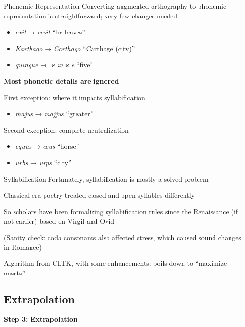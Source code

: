 \documentclass{beamer}
\begin{document}
\begin{frame}{Phonemic Representation}
Converting augmented orthography to phonemic representation is straightforward; very few changes needed
\vspace{-1em}
\begin{itemize}
    \item \emph{exit} → \emph{ecsit} ``he leaves''
    \item \emph{Karthāgō} → \emph{Carthāgō} ``Carthage (city)''
    \item \emph{quīnque} → \emph{\(\varkappa\)īn\(\varkappa\)e} ``five''
\end{itemize}

\textbf{Most phonetic details are ignored}

First exception: where it impacts syllabification
\vspace{-1em}
\begin{itemize}
    \item \emph{majus} → \emph{majjus} ``greater''
\end{itemize}
\vspace{-0.75em}
Second exception: complete neutralization
\vspace{-1em}
\begin{itemize}
    \item \emph{equus} → \emph{ecus} ``horse''
    \item \emph{urbs} → \emph{urps} ``city''
\end{itemize}
\end{frame}

\begin{frame}{Syllabification}
Fortunately, syllabification is mostly a solved problem

Classical-era poetry treated closed and open syllables differently

So scholars have been formalizing syllabification rules since the Renaissance (if not earlier) based on Virgil and Ovid

(Sanity check: coda consonants also affected stress, which caused sound changes in Romance)

Algorithm from CLTK, with some enhancements: boils down to ``maximize onsets''
\end{frame}

\subsection{Extrapolation}

\begin{frame}{}
\begin{center}
\textbf{\Large Step 3: Extrapolation}
\end{center}
\end{frame}
\end{document}
